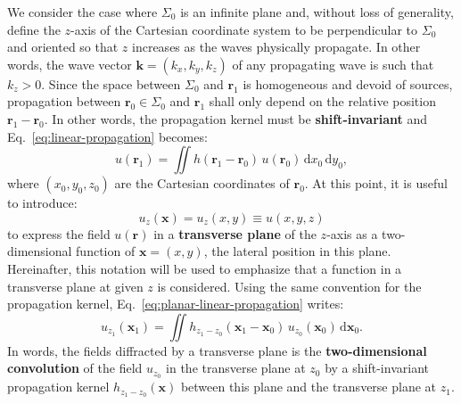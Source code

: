 \documentclass[a4paper]{article}
\newcommand{\V}[1]{\boldsymbol{#1}}
\newcommand*{\mathd}{\mathrm{d}}
\begin{document}
We consider the case where $\Sigma_{0}$ is an infinite plane and, without loss
of generality, define the $z$-axis of the Cartesian coordinate system to be
perpendicular to $\Sigma_{0}$ and oriented so that $z$ increases as the waves
physically propagate. In other words, the wave vector
$\V{k} = (k_{x},k_{y},k_{z})$ of any propagating wave is such that $k_{z} > 0$.
Since the space between $\Sigma_{0}$ and $\V{r}_{1}$ is homogeneous and devoid
of sources, propagation between $\V{r}_{0} ∈ \Sigma_{0}$ and $\V{r}_{1}$ shall
only depend on the relative position $\V{r}_{1} - \V{r}_{0}$. In other words,
the propagation kernel must be \textbf{shift-invariant} and
Eq.~\eqref{eq:linear-propagation} becomes:
\begin{equation}
  \label{eq:planar-linear-propagation}
  u(\V{r}_{1}) = \iint h(\V{r}_{1} - \V{r}_{0})\,u(\V{r}_{0})\,\mathd x_{0}\,\mathd y_{0},
\end{equation}
where $(x_{0},y_{0},z_{0})$ are the Cartesian coordinates of $\V{r}_{0}$. At
this point, it is useful to introduce:
\begin{equation}
  \label{eq:u_z}
  u_{z}(\V{x}) = u_{z}(x,y) ≡ u(x,y,z)
\end{equation}
to express the field $u(\V{r})$ in a \textbf{transverse plane} of the $z$-axis
as a two-dimensional function of $\V{x} = (x,y)$, the lateral position in this
plane. Hereinafter, this notation will be used to emphasize that a function in
a transverse plane at given $z$ is considered. Using the same convention for
the propagation kernel, Eq.~\eqref{eq:planar-linear-propagation} writes:
\begin{equation}
  \label{eq:convolutive-propagation}
  u_{z_{1}}(\V{x}_{1}) =
  \iint h_{z_{1} - z_{0}}(\V{x}_{1} - \V{x}_{0})\,
  u_{z_{0}}(\V{x}_{0})\,\mathd\V{x}_{0}.
\end{equation}
In words, the fields diffracted by a transverse plane is the
\textbf{two-dimensional convolution} of the field $u_{z_{0}}$ in the transverse
plane at $z_{0}$ by a shift-invariant propagation kernel
$h_{z_{1} - z_{0}}(\V{x})$ between this plane and the transverse plane at
$z_{1}$.
\end{document}

